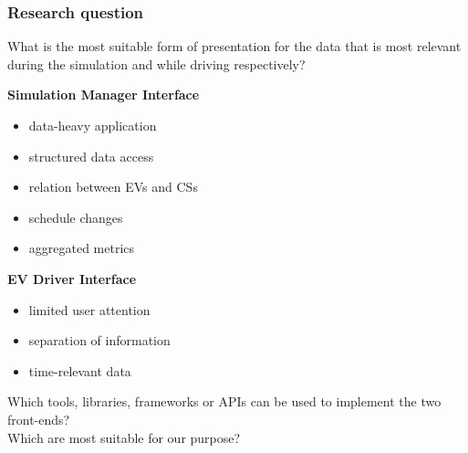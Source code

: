 \begin{frame}
\frametitle{Research question}

What is the most suitable form of presentation for the data that is most relevant during the simulation and while
driving respectively?

\vspace{-8mm}
\begin{PraesentationAufzaehlung}

    \item \textbf{Simulation Manager Interface}
        \begin{itemize}
        \item data-heavy application
        \item structured data access
        \item relation between EVs and CSs
        \item schedule changes
        \item aggregated metrics
        \end{itemize}

    \item \textbf{EV Driver Interface}
        \begin{itemize}
        \item limited user attention
        \item separation of information
        \item time-relevant data
        \end{itemize}

\end{PraesentationAufzaehlung}
\vspace{-2mm}

Which tools, libraries, frameworks or APIs can be used to implement the two front-ends? \\
Which are most suitable for our purpose?

\end{frame}
\clearpage



